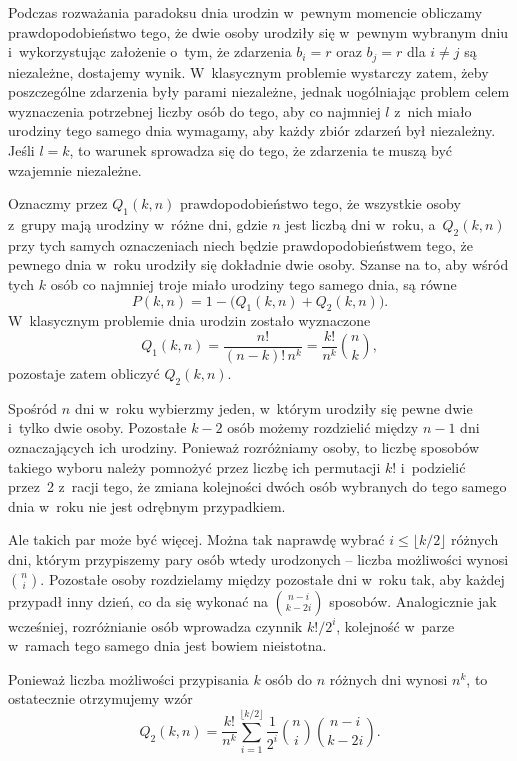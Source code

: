 \exercise %
Podczas rozważania paradoksu dnia urodzin w~pewnym momencie obliczamy prawdopodobieństwo tego, że dwie osoby urodziły się w~pewnym wybranym dniu i~wykorzystując założenie o~tym, że zdarzenia $b_i=r$ oraz $b_j=r$ dla $i\ne j$ są niezależne, dostajemy wynik. W~klasycznym problemie wystarczy zatem, żeby poszczególne zdarzenia były parami niezależne, jednak uogólniając problem celem wyznaczenia potrzebnej liczby osób do tego, aby co najmniej $l$ z~nich miało urodziny tego samego dnia wymagamy, aby każdy  zbiór zdarzeń był niezależny. Jeśli $l=k$, to warunek sprowadza się do tego, że zdarzenia te muszą być wzajemnie niezależne.

\exercise %
Oznaczmy przez $Q_1(k,n)$ prawdopodobieństwo tego, że wszystkie osoby z~grupy  mają urodziny w~różne dni, gdzie $n$ jest liczbą dni w~roku, a~$Q_2(k,n)$ przy tych samych oznaczeniach niech będzie prawdopodobieństwem tego, że pewnego dnia w~roku urodziły się dokładnie dwie osoby. Szanse na to, aby wśród tych $k$ osób co najmniej troje miało urodziny tego samego dnia, są równe
\[
	P(k,n) = 1-\bigl(Q_1(k,n)+Q_2(k,n)\bigr).
\]
W~klasycznym problemie dnia urodzin zostało wyznaczone
\[
	Q_1(k,n) = \frac{n!}{(n-k)!\,n^k} = \frac{k!}{n^k}\binom{n}{k},
\]
pozostaje zatem obliczyć $Q_2(k,n)$.

Spośród $n$ dni w~roku wybierzmy jeden, w~którym urodziły się pewne dwie i~tylko dwie osoby. Pozostałe $k-2$ osób możemy rozdzielić między $n-1$ dni oznaczających ich urodziny. Ponieważ rozróżniamy osoby, to liczbę sposobów takiego wyboru należy pomnożyć przez liczbę ich permutacji $k!$ i~podzielić przez~2 z~racji tego, że zmiana kolejności dwóch osób wybranych do tego samego dnia w~roku nie jest odrębnym przypadkiem.

Ale takich par może być więcej. Można tak naprawdę wybrać $i\le\lfloor k/2\rfloor$ różnych dni, którym przypiszemy pary osób wtedy urodzonych -- liczba możliwości wynosi $\binom{n}{i}$. Pozostałe osoby rozdzielamy między pozostałe dni w~roku tak, aby każdej przypadł inny dzień, co da się wykonać na $\binom{n-i}{k-2i}$ sposobów. Analogicznie jak wcześniej, rozróżnianie osób wprowadza czynnik $k!/2^i$, kolejność w~parze w~ramach tego samego dnia jest bowiem nieistotna.

Ponieważ liczba możliwości przypisania $k$ osób do $n$ różnych dni wynosi $n^k$, to ostatecznie otrzymujemy wzór
\[
	Q_2(k,n) = \frac{k!}{n^k}\sum_{i=1}^{\lfloor k/2\rfloor}\frac{1}{2^i}\binom{n}{i}\binom{n-i}{k-2i}.
\]

